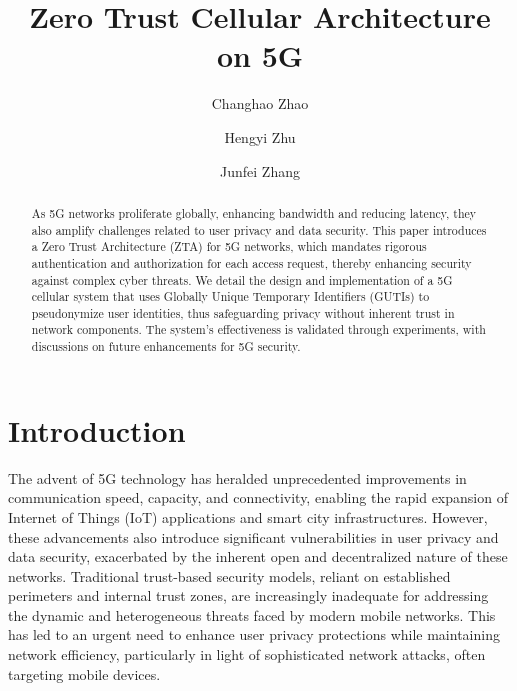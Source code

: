 \documentclass[sigplan,screen]{acmart}
\begin{document}
\title{Zero Trust Cellular Architecture on 5G}


\author{Changhao Zhao}

\author{Hengyi Zhu}

\author{Junfei Zhang}


\begin{abstract}
  As 5G networks proliferate globally, enhancing bandwidth and reducing latency, they also amplify challenges related to user privacy and data security. This paper introduces a Zero Trust Architecture (ZTA) for 5G networks, which mandates rigorous authentication and authorization for each access request, thereby enhancing security against complex cyber threats. We detail the design and implementation of a 5G cellular system that uses Globally Unique Temporary Identifiers (GUTIs) to pseudonymize user identities, thus safeguarding privacy without inherent trust in network components. The system's effectiveness is validated through experiments, with discussions on future enhancements for 5G security.
\end{abstract}




\maketitle

\section{Introduction}

The advent of 5G technology has heralded unprecedented improvements in communication speed, capacity, and connectivity, enabling the rapid expansion of Internet of Things (IoT) applications and smart city infrastructures. However, these advancements also introduce significant vulnerabilities in user privacy and data security, exacerbated by the inherent open and decentralized nature of these networks. Traditional trust-based security models, reliant on established perimeters and internal trust zones, are increasingly inadequate for addressing the dynamic and heterogeneous threats faced by modern mobile networks. This has led to an urgent need to enhance user privacy protections while maintaining network efficiency, particularly in light of sophisticated network attacks, often targeting mobile devices.
\end{document}
